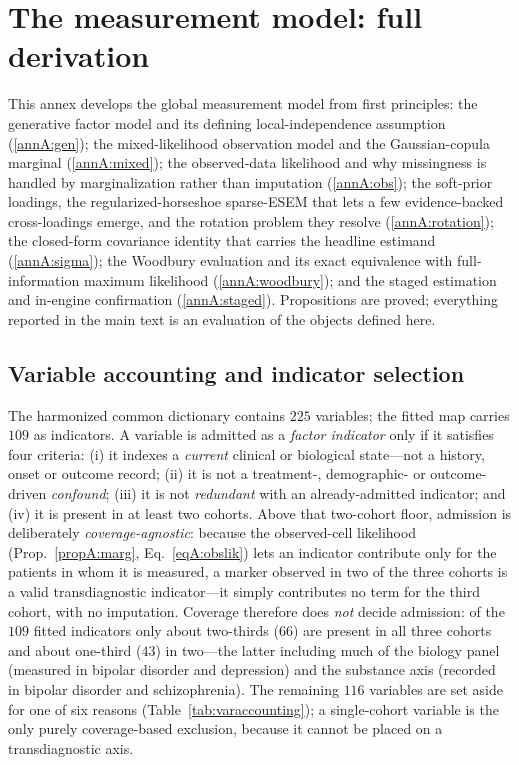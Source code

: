 \section{The measurement model: full derivation}
\label{ann:measurement}

This annex develops the global measurement model from first principles: the generative
factor model and its defining local-independence assumption (\ref{annA:gen}); the
mixed-likelihood observation model and the Gaussian-copula marginal
(\ref{annA:mixed}); the observed-data likelihood and why missingness is handled by
marginalization rather than imputation (\ref{annA:obs}); the soft-prior loadings, the
regularized-horseshoe sparse-ESEM that lets a few evidence-backed cross-loadings emerge,
and the rotation problem they resolve (\ref{annA:rotation}); the closed-form covariance
identity that carries the headline estimand (\ref{annA:sigma}); the Woodbury
evaluation and its exact equivalence with full-information maximum likelihood
(\ref{annA:woodbury}); and the staged estimation and in-engine confirmation
(\ref{annA:staged}). Propositions are proved; everything reported in the main text is
an evaluation of the objects defined here.

\subsection{Variable accounting and indicator selection}
\label{annA:vars}

The harmonized common dictionary contains $225$ variables; the fitted map carries $109$ as
indicators. A variable is admitted as a \emph{factor indicator} only if it satisfies four
criteria: (i) it indexes a \emph{current} clinical or biological state---not a history, onset
or outcome record; (ii) it is not a treatment-, demographic- or outcome-driven
\emph{confound}; (iii) it is not \emph{redundant} with an already-admitted indicator; and
(iv) it is present in at least two cohorts. Above that two-cohort floor, admission is
deliberately \emph{coverage-agnostic}: because the observed-cell likelihood
(Prop.~\ref{propA:marg}, Eq.~\eqref{eqA:obslik}) lets an indicator contribute only for the
patients in whom it is measured, a marker observed in two of the three cohorts is a valid
transdiagnostic indicator---it simply contributes no term for the third cohort, with no
imputation. Coverage therefore does \emph{not} decide admission: of the $109$ fitted
indicators only about two-thirds ($66$) are present in all three cohorts and about one-third
($43$) in two---the latter including much of the biology panel (measured in bipolar disorder
and depression) and the substance axis (recorded in bipolar disorder and schizophrenia). The
remaining $116$ variables are set aside for one of six reasons (Table~\ref{tab:varaccounting});
a single-cohort variable is the only purely coverage-based exclusion, because it cannot be
placed on a transdiagnostic axis.

